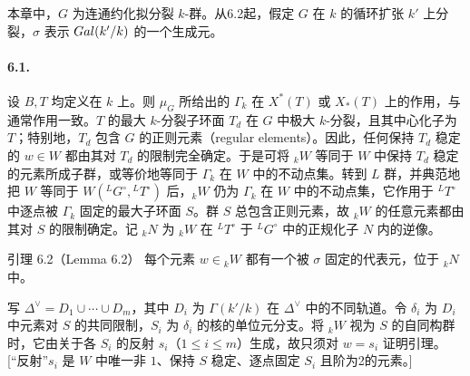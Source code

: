 本章中，$G$ 为连通约化拟分裂 $k$-群。从6.2起，假定 $G$ 在 $k$ 的循环扩张 $k'$ 上分裂，$\sigma$ 表示 $Gal(k'/k)$ 的一个生成元。

\paragraph*{6.1.} 设 $B,T$ 均定义在 $k$ 上。则 $\mu_G$ 所给出的 $\Gamma_k$ 在 $X^*(T)$ 或 $X_*(T)$ 上的作用，与通常作用一致。$T$ 的最大 $k$-分裂子环面 $T_d$ 在 $G$ 中极大 $k$-分裂，且其中心化子为 $T$；特别地，$T_d$ 包含 $G$ 的正则元素（regular elements）。因此，任何保持 $T_d$ 稳定的 $w\in W$ 都由其对 $T_d$ 的限制完全确定。于是可将 ${}_kW$ 等同于 $W$ 中保持 $T_d$ 稳定的元素所成子群，或等价地等同于 $\Gamma_k$ 在 $W$ 中的不动点集。转到 $L$ 群，并典范地把 $W$ 等同于 $W({}^LG^\circ,{}^LT^\circ)$ 后，${}_kW$ 仍为 $\Gamma_k$ 在 $W$ 中的不动点集，它作用于 ${}^LT^\circ$ 中逐点被 $\Gamma_k$ 固定的最大子环面 $S$。群 $S$ 总包含正则元素，故 ${}_kW$ 的任意元素都由其对 $S$ 的限制确定。记 ${}_kN$ 为 ${}_kW$ 在 ${}^LT^\circ$ 于 ${}^LG^\circ$ 中的正规化子 $N$ 内的逆像。

\begin{originaltheorem}{引理 6.2（Lemma 6.2）}
每个元素 $w\in{}_kW$ 都有一个被 $\sigma$ 固定的代表元，位于 ${}_kN$ 中。
\end{originaltheorem}
写 $\Delta^\vee=D_1\cup\cdots\cup D_m$，其中 $D_i$ 为 $\Gamma(k'/k)$ 在 $\Delta^\vee$ 中的不同轨道。令 $\delta_i$ 为 $D_i$ 中元素对 $S$ 的共同限制，$S_i$ 为 $\delta_i$ 的核的单位元分支。将 ${}_kW$ 视为 $S$ 的自同构群时，它由关于各 $S_i$ 的反射 $s_i$（$1\leq i\leq m$）生成，故只须对 $w=s_i$ 证明引理。[“反射”$s_i$ 是 $W$ 中唯一非 $1$、保持 $S$ 稳定、逐点固定 $S_i$ 且阶为2的元素。]

